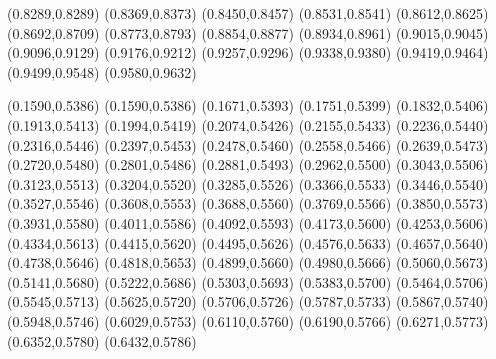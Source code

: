 (0.8289,0.8289)                              
(0.8369,0.8373)                              
(0.8450,0.8457)                              
(0.8531,0.8541)                              
(0.8612,0.8625)                              
(0.8692,0.8709)                              
(0.8773,0.8793)                              
(0.8854,0.8877)                              
(0.8934,0.8961)                              
(0.9015,0.9045)                              
(0.9096,0.9129)                              
(0.9176,0.9212)                              
(0.9257,0.9296)                              
(0.9338,0.9380)                              
(0.9419,0.9464)                              
(0.9499,0.9548)                              
(0.9580,0.9632)                              

\PST@LongDash(0.1590,0.5386)
(0.1590,0.5386)             
(0.1671,0.5393)             
(0.1751,0.5399)             
(0.1832,0.5406)             
(0.1913,0.5413)             
(0.1994,0.5419)             
(0.2074,0.5426)             
(0.2155,0.5433)             
(0.2236,0.5440)             
(0.2316,0.5446)             
(0.2397,0.5453)             
(0.2478,0.5460)             
(0.2558,0.5466)             
(0.2639,0.5473)             
(0.2720,0.5480)             
(0.2801,0.5486)             
(0.2881,0.5493)             
(0.2962,0.5500)             
(0.3043,0.5506)             
(0.3123,0.5513)             
(0.3204,0.5520)             
(0.3285,0.5526)             
(0.3366,0.5533)             
(0.3446,0.5540)             
(0.3527,0.5546)             
(0.3608,0.5553)             
(0.3688,0.5560)             
(0.3769,0.5566)             
(0.3850,0.5573)             
(0.3931,0.5580)             
(0.4011,0.5586)             
(0.4092,0.5593)             
(0.4173,0.5600)             
(0.4253,0.5606)             
(0.4334,0.5613)             
(0.4415,0.5620)             
(0.4495,0.5626)             
(0.4576,0.5633)             
(0.4657,0.5640)             
(0.4738,0.5646)             
(0.4818,0.5653)             
(0.4899,0.5660)             
(0.4980,0.5666)             
(0.5060,0.5673)             
(0.5141,0.5680)             
(0.5222,0.5686)             
(0.5303,0.5693)             
(0.5383,0.5700)             
(0.5464,0.5706)             
(0.5545,0.5713)             
(0.5625,0.5720)             
(0.5706,0.5726)             
(0.5787,0.5733)             
(0.5867,0.5740)             
(0.5948,0.5746)             
(0.6029,0.5753)             
(0.6110,0.5760)             
(0.6190,0.5766)             
(0.6271,0.5773)             
(0.6352,0.5780)             
(0.6432,0.5786)             
